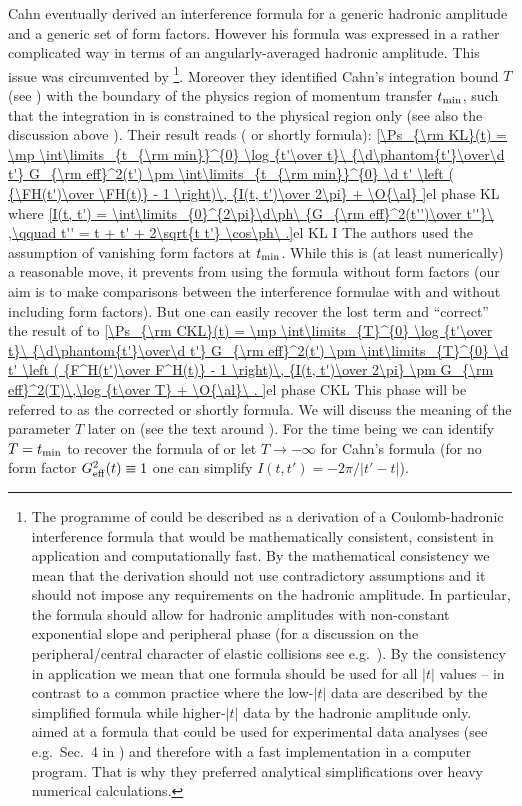 Cahn eventually derived an interference formula for a generic hadronic amplitude and a generic set of form factors. However his formula was expressed in a rather complicated way in terms of an angularly-averaged hadronic amplitude. This issue was circumvented by \KaL{} \footnote{%
The programme of \KaL{} could be described as a derivation of a Coulomb-hadronic interference formula that would be mathematically consistent, consistent in application and computationally fast. By the mathematical consistency we mean that the derivation should not use contradictory assumptions and it should not impose any requirements on the hadronic amplitude. In particular, the formula should allow for hadronic amplitudes with non-constant exponential slope and peripheral phase (for a discussion on the peripheral/central character of elastic collisions see e.g.~). By the consistency in application we mean that one formula should be used for all $|t|$ values -- in contrast to a common practice where the low-$|t|$ data are described by the simplified \WaY{} formula  while higher-$|t|$ data by the hadronic amplitude only. \KaL{} aimed at a formula that could be used for experimental data analyses (see e.g.~Sec.~4 in ) and therefore with a fast implementation in a computer program. That is why they preferred analytical simplifications over heavy numerical calculations.
}. Moreover they identified Cahn's integration bound $T$ (see ) with the boundary of the physics region of momentum transfer $t_{\rm min}$, such that the integration in  is constrained to the physical region only (see also the discussion above ). Their result reads (\KL{} or shortly  formula):
\eqref{\Ps_{\rm KL}(t) =
	\mp \int\limits_{t_{\rm min}}^{0} \log {t'\over t}\ {\d\phantom{t'}\over\d t'} G_{\rm eff}^2(t')
	\pm \int\limits_{t_{\rm min}}^{0} \d t' \left ( {\FH(t')\over \FH(t)} - 1 \right)\, {I(t, t')\over 2\pi}
	+ \O{\al}
}{el phase KL}
where
\eqref{I(t, t') = \int\limits_{0}^{2\pi}\d\ph\ {G_{\rm eff}^2(t'')\over t''}\ ,\qquad t'' = t + t' + 2\sqrt{t t'} \cos\ph\ .}{el KL I}
The authors used the assumption of vanishing form factors at $t_{\rm min}$. While this is (at least numerically) a reasonable move, it prevents from using the formula without form factors (our aim is to make comparisons between the interference formulae with and without including form factors). But one can easily recover the lost term and ``correct'' the result of \KL{} to
\eqref{\Ps_{\rm CKL}(t) =
	\mp \int\limits_{T}^{0} \log {t'\over t}\ {\d\phantom{t'}\over\d t'} G_{\rm eff}^2(t')
	\pm \int\limits_{T}^{0} \d t' \left ( {F^H(t')\over F^H(t)} - 1 \right)\, {I(t, t')\over 2\pi}
	\pm G_{\rm eff}^2(T)\,\log {t\over T}
	+ \O{\al}\ .
}{el phase CKL}
This phase will be referred to as the corrected \KL{} or shortly  formula. We will discuss the meaning of the parameter $T$ later on (see the text around ). For the time being we can identify $T = t_{\rm min}$ to recover the formula of \KL{} or let $T\to -\infty$ for Cahn's formula (for no form factor $G_{\rm eff}^2(t) \equiv 1$ one can simplify $I(t, t') = -2\pi / |t' - t|$).

